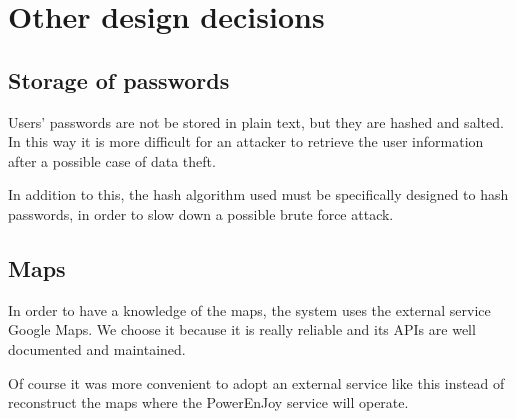 \section{Other design decisions}

\subsection{Storage of passwords}
Users' passwords are not be stored in plain text, but they are hashed and salted.
In this way it is more difficult for an attacker to retrieve the user information after a possible case of data theft.

In addition to this, the hash algorithm used must be specifically designed to hash passwords, in order to slow down a possible brute force attack.

\subsection{Maps}
In order to have a knowledge of the maps, the system uses the external service Google Maps. We choose it because it is really reliable and its APIs are well documented and maintained.

Of course it was more convenient to adopt an external service like this instead of reconstruct the maps where the PowerEnJoy service will operate.